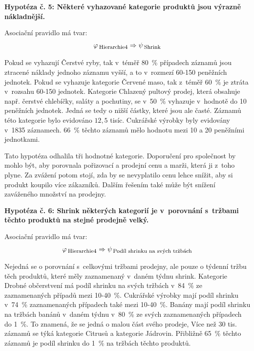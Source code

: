 \vspace*{1em}

\textbf{Hypotéza č. 5: Některé vyhazované kategorie produktů jsou výrazně nákladnější.}

Asociační pravidlo má tvar:
\begin{equation}
    \varphi_{\mbox{\,\footnotesize Hierarchie4}} \Rightarrow \psi_{\mbox{\,\footnotesize Shrink}}
\end{equation}

Pokud se vyhazují Čerstvé ryby, tak v~téměř 80~\% případech záznamů jsou ztracené náklady jednoho záznamu vyšší, a to v~rozmezí 60-150 peněžních jednotek.
Pokud se vyhazuje kategorie Červené maso, tak z~téměř 60~\% je ztráta v~rozsahu 60-150 jednotek.
Kategorie Chlazený pultový prodej, která obsahuje např. čerstvé chlebíčky, saláty a pochutiny, se v~50~\% vyhazuje v~hodnotě do 10 peněžních jednotek. Jedná se tedy o nižší částky, které jsou ale časté. Záznamů této kategorie bylo evidováno $12{,}5$ tisíc.
Cukrářské výrobky byly evidovány v~1835 záznamech. 66~\% těchto záznamů mělo hodnotu mezi 10 a 20 peněžními jednotkami.

Tato hypotéza odhalila tři hodnotné kategorie. Doporučení pro společnost by mohlo být, aby porovnala pořizovací a prodejní cenu a marži, která ji z~toho plyne. Za zvážení potom stojí, zda by se nevyplatilo cenu lehce snížit, aby si produkt koupilo více zákazníků. Dalším řešením také může být snížení zaváženého množství na prodejny. 

\vspace*{1em}

\textbf{Hypotéza č. 6: Shrink některých kategorií je v~porovnání s~tržbami těchto produktů na stejné prodejně velký.}

Asociační pravidlo má tvar:
\begin{equation}
    \varphi_{\mbox{\,\footnotesize Hierarchie4}} \Rightarrow \psi_{\mbox{\,\footnotesize Podíl shrinku na svých tržbách}}
\end{equation}

Nejedná se o porovnání s~celkovými tržbami prodejny, ale pouze o týdenní tržbu těch produktů, které měly zaznamenaný v~daném týdnu shrink.
Kategorie Drobné občerstvení má podíl shrinku na svých tržbách v~84~\% ze zaznamenaných případů mezi 10-40~\%.
Cukrářské výrobky  mají podíl shrinku v~74~\% zaznamenaných případech také mezi 10-40~\%.
Banány mají podíl shrinku na tržbách banánů v~daném týdnu v~80~\% ze svých zaznamenaných případech do 1~\%. To znamená, že se jedná o malou část svého prodeje,
Více než 30 tis. záznamů se týká kategorie Citrusů a kategorie Jádrovin. Přibližně 65~\% těchto záznamů je podíl shrinku do 1~\% na tržbách těchto produktů.

